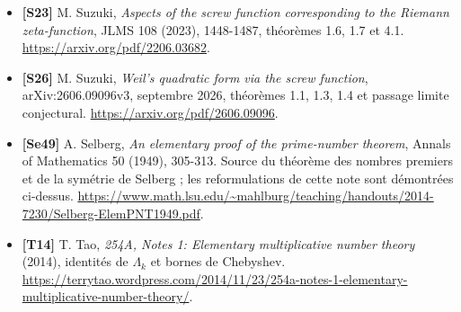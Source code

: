 \documentclass[
  11pt,
  a4paper,
]{article}
\providecommand{\tightlist}{%
  \setlength{\itemsep}{0pt}\setlength{\parskip}{0pt}}
\begin{document}
\begin{itemize}
\tightlist
\item
  \textbf{{[}S23{]}} M. Suzuki, \emph{Aspects of the screw function
  corresponding to the Riemann zeta-function}, JLMS 108 (2023),
  1448-1487, théorèmes 1.6, 1.7 et 4.1.
  \url{https://arxiv.org/pdf/2206.03682}.
\item
  \textbf{{[}S26{]}} M. Suzuki, \emph{Weil's quadratic form via the
  screw function}, arXiv:2606.09096v3, septembre 2026, théorèmes 1.1,
  1.3, 1.4 et passage limite conjectural.
  \url{https://arxiv.org/pdf/2606.09096}.
\item
  \textbf{{[}Se49{]}} A. Selberg, \emph{An elementary proof of the
  prime-number theorem}, Annals of Mathematics 50 (1949), 305-313.
  Source du théorème des nombres premiers et de la symétrie de Selberg ;
  les reformulations de cette note sont démontrées ci-dessus.
  \url{https://www.math.lsu.edu/~mahlburg/teaching/handouts/2014-7230/Selberg-ElemPNT1949.pdf}.
\item
  \textbf{{[}T14{]}} T. Tao, \emph{254A, Notes 1: Elementary
  multiplicative number theory} (2014), identités de \(\Lambda_k\) et
  bornes de Chebyshev.
  \url{https://terrytao.wordpress.com/2014/11/23/254a-notes-1-elementary-multiplicative-number-theory/}.
\end{itemize}
\end{document}
